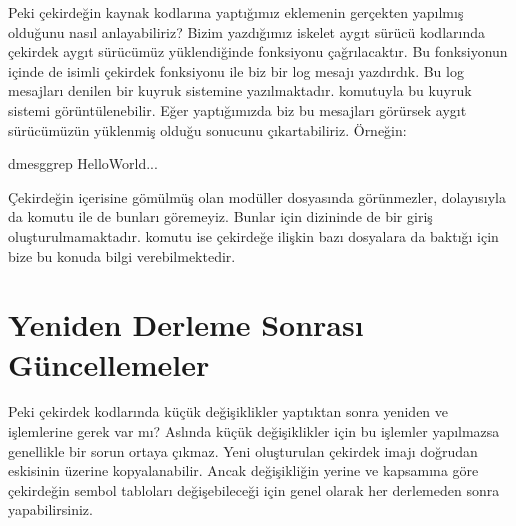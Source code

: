 \documentclass[a4paper,10pt,turkish]{sphinxmanual}
\begin{document}
\sphinxAtStartPar
Peki çekirdeğin kaynak kodlarına yaptığımız eklemenin gerçekten yapılmış olduğunu nasıl anlayabiliriz?
Bizim yazdığımız iskelet aygıt sürücü kodlarında çekirdek aygıt sürücümüz yüklendiğinde
 fonksiyonu çağrılacaktır. Bu fonksiyonun içinde de  isimli çekirdek fonksiyonu
ile biz bir log mesajı yazdırdık. Bu log mesajları  denilen bir kuyruk sistemine
yazılmaktadır.  komutuyla bu kuyruk sistemi görüntülenebilir. Eğer  yaptığımızda biz bu
mesajları görürsek aygıt sürücümüzün yüklenmiş olduğu sonucunu çıkartabiliriz. Örneğin:

\begin{sphinxVerbatim}[commandchars=\\\{\}]
\PYGZdl{}dmesggrep
HelloWorld...
\end{sphinxVerbatim}

\sphinxAtStartPar
Çekirdeğin içerisine gömülmüş olan modüller  dosyasında görünmezler, dolayısıyla da
 komutu ile de bunları göremeyiz. Bunlar için  dizininde de bir giriş
oluşturulmamaktadır.  komutu ise çekirdeğe ilişkin bazı dosyalara da baktığı için bize bu
konuda bilgi verebilmektedir.


\section{Yeniden Derleme Sonrası Güncellemeler}
\label{\detokenize{kernelcompilation:yeniden-derleme-sonrasi-guncellemeler}}
\sphinxAtStartPar
Peki çekirdek kodlarında küçük değişiklikler yaptıktan sonra yeniden  ve
 işlemlerine gerek var mı? Aslında küçük değişiklikler için bu işlemler yapılmazsa
genellikle bir sorun ortaya çıkmaz. Yeni oluşturulan çekirdek imajı doğrudan eskisinin üzerine
kopyalanabilir. Ancak değişikliğin yerine ve kapsamına göre çekirdeğin sembol tabloları değişebileceği
için genel olarak her derlemeden sonra  yapabilirsiniz.
\end{document}

